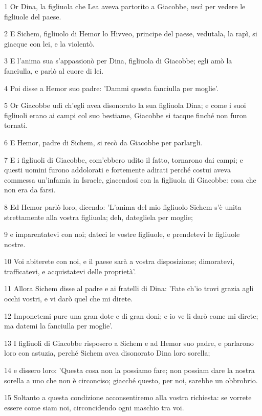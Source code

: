 \par 1 Or Dina, la figliuola che Lea aveva partorito a Giacobbe, uscì per vedere le figliuole del paese.
\par 2 E Sichem, figliuolo di Hemor lo Hivveo, principe del paese, vedutala, la rapì, si giacque con lei, e la violentò.
\par 3 E l'anima sua s'appassionò per Dina, figliuola di Giacobbe; egli amò la fanciulla, e parlò al cuore di lei.
\par 4 Poi disse a Hemor suo padre: 'Dammi questa fanciulla per moglie'.
\par 5 Or Giacobbe udì ch'egli avea disonorato la sua figliuola Dina; e come i suoi figliuoli erano ai campi col suo bestiame, Giacobbe si tacque finché non furon tornati.
\par 6 E Hemor, padre di Sichem, si recò da Giacobbe per parlargli.
\par 7 E i figliuoli di Giacobbe, com'ebbero udito il fatto, tornarono dai campi; e questi uomini furono addolorati e fortemente adirati perché costui aveva commessa un'infamia in Israele, giacendosi con la figliuola di Giacobbe: cosa che non era da farsi.
\par 8 Ed Hemor parlò loro, dicendo: 'L'anima del mio figliuolo Sichem s'è unita strettamente alla vostra figliuola; deh, dategliela per moglie;
\par 9 e imparentatevi con noi; dateci le vostre figliuole, e prendetevi le figliuole nostre.
\par 10 Voi abiterete con noi, e il paese sarà a vostra disposizione; dimoratevi, trafficatevi, e acquistatevi delle proprietà'.
\par 11 Allora Sichem disse al padre e ai fratelli di Dina: 'Fate ch'io trovi grazia agli occhi vostri, e vi darò quel che mi direte.
\par 12 Imponetemi pure una gran dote e di gran doni; e io ve li darò come mi direte; ma datemi la fanciulla per moglie'.
\par 13 I figliuoli di Giacobbe risposero a Sichem e ad Hemor suo padre, e parlarono loro con astuzia, perché Sichem avea disonorato Dina loro sorella;
\par 14 e dissero loro: 'Questa cosa non la possiamo fare; non possiam dare la nostra sorella a uno che non è circonciso; giacché questo, per noi, sarebbe un obbrobrio.
\par 15 Soltanto a questa condizione acconsentiremo alla vostra richiesta: se vorrete essere come siam noi, circoncidendo ogni maschio tra voi.
